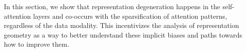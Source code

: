In this section, we show that representation degeneration happens in the self-attention layers and co-occurs with the sparsification of attention patterns, regardless of the data modality. This incentivizes the analysis of representation geometry as a way to better understand these implicit biases and paths towards how to improve them. 



